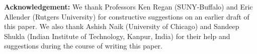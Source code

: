 \documentclass{svproc}
\begin{document}
















\vspace*{.2in}

\noindent
{\bf Acknowledgement:} We thank
Professors Ken Regan (SUNY-Buffalo) and Eric Allender (Rutgers University)
for constructive suggestions on an earlier draft of this paper.
We also thank Ashish Naik (University of Chicago) and 
Sandeep Shukla (Indian Institute of Technology, Kanpur, India) 
for their help and suggestions during the course of writing this paper.

\clearpage



\clearpage

\setcounter{page}{0}
\thispagestyle{empty}


\end{document}
